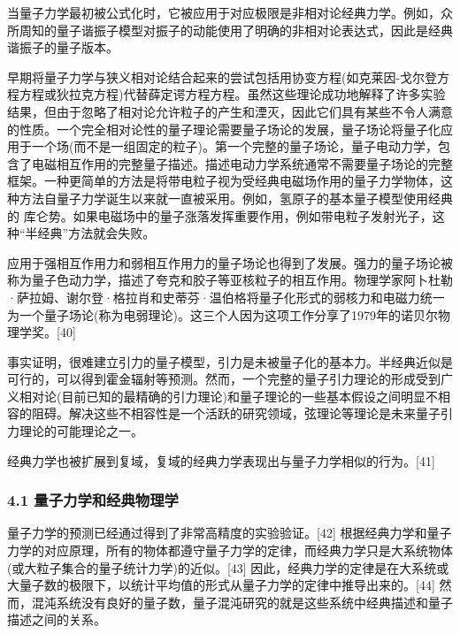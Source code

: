 当量子力学最初被公式化时，它被应用于对应极限是非相对论经典力学。例如，众所周知的量子谐振子模型对振子的动能使用了明确的非相对论表达式，因此是经典谐振子的量子版本。

早期将量子力学与狭义相对论结合起来的尝试包括用协变方程(如克莱因-戈尔登方程方程或狄拉克方程)代替薛定谔方程方程。虽然这些理论成功地解释了许多实验结果，但由于忽略了相对论允许粒子的产生和湮灭，因此它们具有某些不令人满意的性质。一个完全相对论性的量子理论需要量子场论的发展，量子场论将量子化应用于一个场(而不是一组固定的粒子)。第一个完整的量子场论，量子电动力学，包含了电磁相互作用的完整量子描述。描述电动力学系统通常不需要量子场论的完整框架。一种更简单的方法是将带电粒子视为受经典电磁场作用的量子力学物体，这种方法自量子力学诞生以来就一直被采用。例如，氢原子的基本量子模型使用经典的   库仑势。如果电磁场中的量子涨落发挥重要作用，例如带电粒子发射光子，这种“半经典”方法就会失败。

应用于强相互作用力和弱相互作用力的量子场论也得到了发展。强力的量子场论被称为量子色动力学，描述了夸克和胶子等亚核粒子的相互作用。物理学家阿卜杜勒·萨拉姆、谢尔登·格拉肖和史蒂芬·温伯格将量子化形式的弱核力和电磁力统一为一个量子场论(称为电弱理论)。这三个人因为这项工作分享了1979年的诺贝尔物理学奖。[40]

事实证明，很难建立引力的量子模型，引力是未被量子化的基本力。半经典近似是可行的，可以得到霍金辐射等预测。然而，一个完整的量子引力理论的形成受到广义相对论(目前已知的最精确的引力理论)和量子理论的一些基本假设之间明显不相容的阻碍。解决这些不相容性是一个活跃的研究领域，弦理论等理论是未来量子引力理论的可能理论之一。

经典力学也被扩展到复域，复域的经典力学表现出与量子力学相似的行为。[41]

\subsubsection{4.1 量子力学和经典物理学}
量子力学的预测已经通过得到了非常高精度的实验验证。[42] 根据经典力学和量子力学的对应原理，所有的物体都遵守量子力学的定律，而经典力学只是大系统物体(或大粒子集合的量子统计力学)的近似。[43] 因此，经典力学的定律是在大系统或大量子数的极限下，以统计平均值的形式从量子力学的定律中推导出来的。[44] 然而，混沌系统没有良好的量子数，量子混沌研究的就是这些系统中经典描述和量子描述之间的关系。

